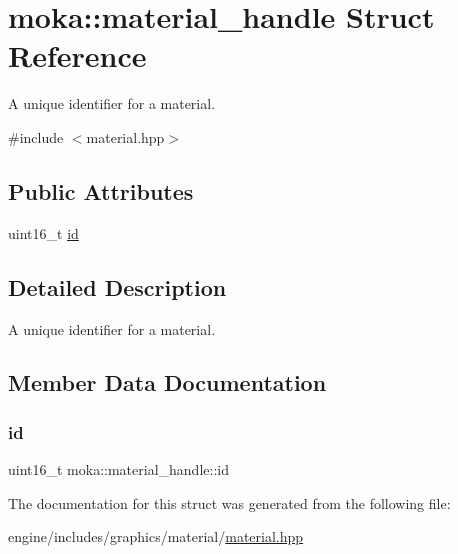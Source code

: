 \hypertarget{structmoka_1_1material__handle}{}\section{moka\+::material\+\_\+handle Struct Reference}
\label{structmoka_1_1material__handle}


A unique identifier for a material.  




{\ttfamily \#include $<$material.\+hpp$>$}

\subsection*{Public Attributes}
\begin{DoxyCompactItemize}
\item 
uint16\+\_\+t \mbox{\hyperlink{structmoka_1_1material__handle_ae3b2ec4bdf94a2ef75cb634aa5e59317}{id}}
\end{DoxyCompactItemize}


\subsection{Detailed Description}
A unique identifier for a material. 

\subsection{Member Data Documentation}
\mbox{\label{structmoka_1_1material__handle_ae3b2ec4bdf94a2ef75cb634aa5e59317}} 
\subsubsection{\texorpdfstring{id}{id}}
{\footnotesize\ttfamily uint16\+\_\+t moka\+::material\+\_\+handle\+::id}



The documentation for this struct was generated from the following file\+:\begin{DoxyCompactItemize}
\item 
engine/includes/graphics/material/\mbox{\hyperlink{material_8hpp}{material.\+hpp}}\end{DoxyCompactItemize}
